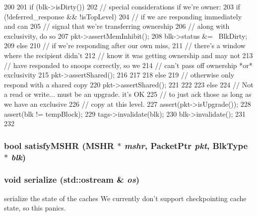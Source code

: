 \begin{DoxyCode}
{{{{200 
201                 if (blk->isDirty()) {
202                     // special considerations if we're owner:
203                     if (!deferred_response && !isTopLevel) {
204                         // if we are responding immediately and can
205                         // signal that we're transferring ownership
206                         // along with exclusivity, do so
207                         pkt->assertMemInhibit();
208                         blk->status &= ~BlkDirty;
209                     } else {
210                         // if we're responding after our own miss,
211                         // there's a window where the recipient didn't
212                         // know it was getting ownership and may not
213                         // have responded to snoops correctly, so we
214                         // can't pass off ownership *or* exclusivity
215                         pkt->assertShared();
216                     }
217                 }
218             } else {
219                 // otherwise only respond with a shared copy
220                 pkt->assertShared();
221             }
222         }
223     } else {
224         // Not a read or write... must be an upgrade.  it's OK
225         // to just ack those as long as we have an exclusive
226         // copy at this level.
227         assert(pkt->isUpgrade());
228         assert(blk != tempBlock);
229         tags->invalidate(blk);
230         blk->invalidate();
231     }
232 }
\end{DoxyCode}
\hypertarget{classCache_a65c1c67b81573ca17c8ad40e0e6d85d8}{
\subsubsection[{satisfyMSHR}]{\setlength{\rightskip}{0pt plus 5cm}bool satisfyMSHR ({\bf MSHR} $\ast$ {\em mshr}, \/  {\bf PacketPtr} {\em pkt}, \/  {\bf BlkType} $\ast$ {\em blk})}}
\label{classCache_a65c1c67b81573ca17c8ad40e0e6d85d8}
\hypertarget{classCache_a53e036786d17361be4c7320d39c99b84}{
\subsubsection[{serialize}]{\setlength{\rightskip}{0pt plus 5cm}void serialize (std::ostream \& {\em os})}}
\label{classCache_a53e036786d17361be4c7320d39c99b84}
serialize the state of the caches We currently don't support checkpointing cache state, so this panics. 

